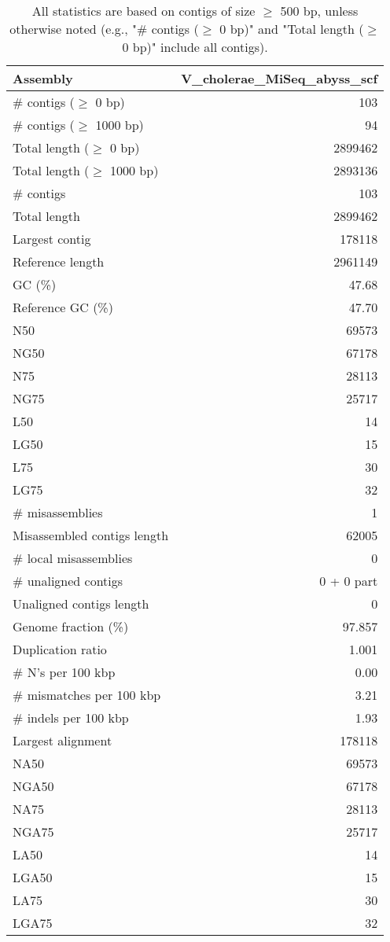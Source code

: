 \documentclass[12pt,a4paper]{article}
\begin{document}
\begin{table}[ht]
\begin{center}
\caption{All statistics are based on contigs of size $\geq$ 500 bp, unless otherwise noted (e.g., "\# contigs ($\geq$ 0 bp)" and "Total length ($\geq$ 0 bp)" include all contigs).}
\begin{tabular}{|l*{1}{|r}|}
\hline
Assembly & V\_cholerae\_MiSeq\_abyss\_scf \\ \hline
\# contigs ($\geq$ 0 bp) & 103 \\ \hline
\# contigs ($\geq$ 1000 bp) & 94 \\ \hline
Total length ($\geq$ 0 bp) & 2899462 \\ \hline
Total length ($\geq$ 1000 bp) & 2893136 \\ \hline
\# contigs & 103 \\ \hline
Total length & 2899462 \\ \hline
Largest contig & 178118 \\ \hline
Reference length & 2961149 \\ \hline
GC (\%) & 47.68 \\ \hline
Reference GC (\%) & 47.70 \\ \hline
N50 & 69573 \\ \hline
NG50 & 67178 \\ \hline
N75 & 28113 \\ \hline
NG75 & 25717 \\ \hline
L50 & 14 \\ \hline
LG50 & 15 \\ \hline
L75 & 30 \\ \hline
LG75 & 32 \\ \hline
\# misassemblies & 1 \\ \hline
Misassembled contigs length & 62005 \\ \hline
\# local misassemblies & 0 \\ \hline
\# unaligned contigs & 0 + 0 part \\ \hline
Unaligned contigs length & 0 \\ \hline
Genome fraction (\%) & 97.857 \\ \hline
Duplication ratio & 1.001 \\ \hline
\# N's per 100 kbp & 0.00 \\ \hline
\# mismatches per 100 kbp & 3.21 \\ \hline
\# indels per 100 kbp & 1.93 \\ \hline
Largest alignment & 178118 \\ \hline
NA50 & 69573 \\ \hline
NGA50 & 67178 \\ \hline
NA75 & 28113 \\ \hline
NGA75 & 25717 \\ \hline
LA50 & 14 \\ \hline
LGA50 & 15 \\ \hline
LA75 & 30 \\ \hline
LGA75 & 32 \\ \hline
\end{tabular}
\end{center}
\end{table}
\end{document}
